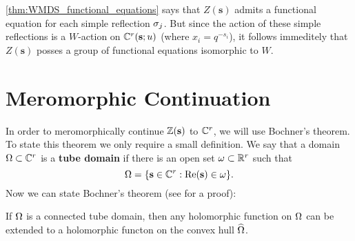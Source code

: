 \documentclass[12pt,reqno,oneside]{amsart}
\begin{document}
    \cref{thm:WMDS_functional_equations} says that $Z(\mathbf{s})$ admits a functional equation for each simple reflection $\sigma_{j}$. But since the action of these simple reflections is a $W$-action on $\mathbb{C}^{r}(\mathbf{s};u)$ (where $x_{i} = q^{-s_{i}}$), it follows immeditely that $Z(\mathbf{s})$ posses a group of functional equations isomorphic to $W$.
\section{Meromorphic Continuation}
    In order to meromorphically continue $\mathbb{Z}(\mathbf{s})$ to $\mathbb{C}^{r}$, we will use Bochner's theorem. To state this theorem we only require a small definition. We say that a domain $\Omega \subset \mathbb{C}^{r}$ is a \textbf{tube domain} if there is an open set $\omega \subset \mathbb{R}^{r}$ such that
    \[
        \Omega = \{\mathbf{s} \in \mathbb{C}^{r}:\mathrm{Re}(\mathbf{s}) \in \omega\}.
    \]
    Now we can state Bochner's theorem (see \cite{H} for a proof):

    \begin{theorem}
        If $\Omega$ is a connected tube domain, then any holomorphic function on $\Omega$ can be extended to a holomorphic functon on the convex hull $\widehat{\Omega}$.
    \end{theorem}
\end{document}
